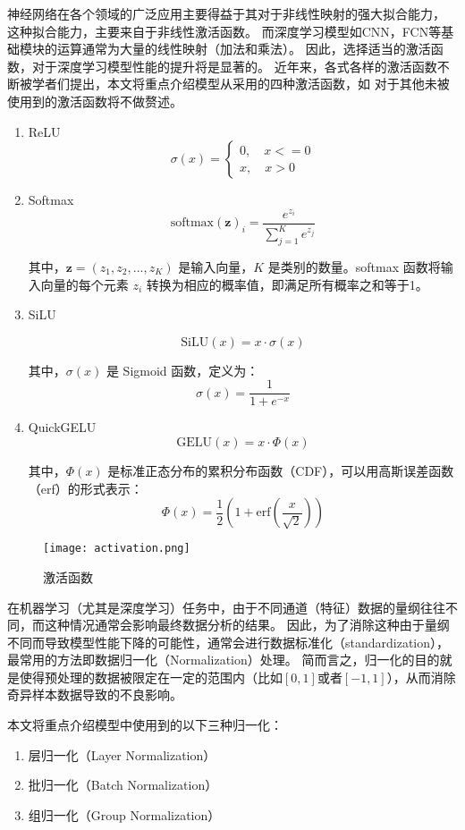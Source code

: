 
神经网络在各个领域的广泛应用主要得益于其对于非线性映射的强大拟合能力，
这种拟合能力，主要来自于非线性激活函数。
而深度学习模型如CNN，FCN等基础模块的运算通常为大量的线性映射（加法和乘法）。
因此，选择适当的激活函数，对于深度学习模型性能的提升将是显著的。
近年来，各式各样的激活函数不断被学者们提出，本文将重点介绍模型从采用的四种激活函数，如
对于其他未被使用到的激活函数将不做赘述。
\begin{enumerate}
  \item ReLU
  \begin{equation}
    \sigma(x) = 
    \left\{
    \begin{aligned}
      0, \quad x <= 0 \\
      x, \quad x > 0
    \end{aligned}
    \right.
    \end{equation}
  \item Softmax
  \[
\text{softmax}(\mathbf{z})_i = \frac{e^{z_i}}{\sum_{j=1}^{K} e^{z_j}}
\]

其中，$\mathbf{z} = (z_1, z_2, ..., z_K)$ 是输入向量，$K$ 是类别的数量。softmax 函数将输入向量的每个元素 $z_i$ 转换为相应的概率值，即满足所有概率之和等于1。

  \item SiLU

  \[
  \text{SiLU}(x) = x \cdot \sigma(x)
  \]
  
  其中，$\sigma(x)$ 是 Sigmoid 函数，定义为：
  \[
  \sigma(x) = \frac{1}{1 + e^{-x}}
  \]

  \item QuickGELU
\[
\text{GELU}(x) = x \cdot \Phi(x)
\]

其中，$\Phi(x)$ 是标准正态分布的累积分布函数（CDF），可以用高斯误差函数（erf）的形式表示：
\[
\Phi(x) = \frac{1}{2} \left(1 + \text{erf} \left(\frac{x}{\sqrt{2}}\right)\right)
\]

\end{enumerate}
\begin{figure}[h]
  \centering
\texttt{[image: activation.png]}
\caption{激活函数}
\label{figure:activation}
  
\end{figure}

在机器学习（尤其是深度学习）任务中，由于不同通道（特征）数据的量纲往往不同，而这种情况通常会影响最终数据分析的结果。
因此，为了消除这种由于量纲不同而导致模型性能下降的可能性，通常会进行数据标准化（standardization），最常用的方法即数据归一化（Normalization）处理。
简而言之，归一化的目的就是使得预处理的数据被限定在一定的范围内（比如$[0,1]$或者$[-1,1]$），从而消除奇异样本数据导致的不良影响。

本文将重点介绍模型中使用到的以下三种归一化：
\begin{enumerate}
  \item 层归一化（Layer Normalization）
  \item 批归一化（Batch Normalization）
  \item 组归一化（Group Normalization）
\end{enumerate}

